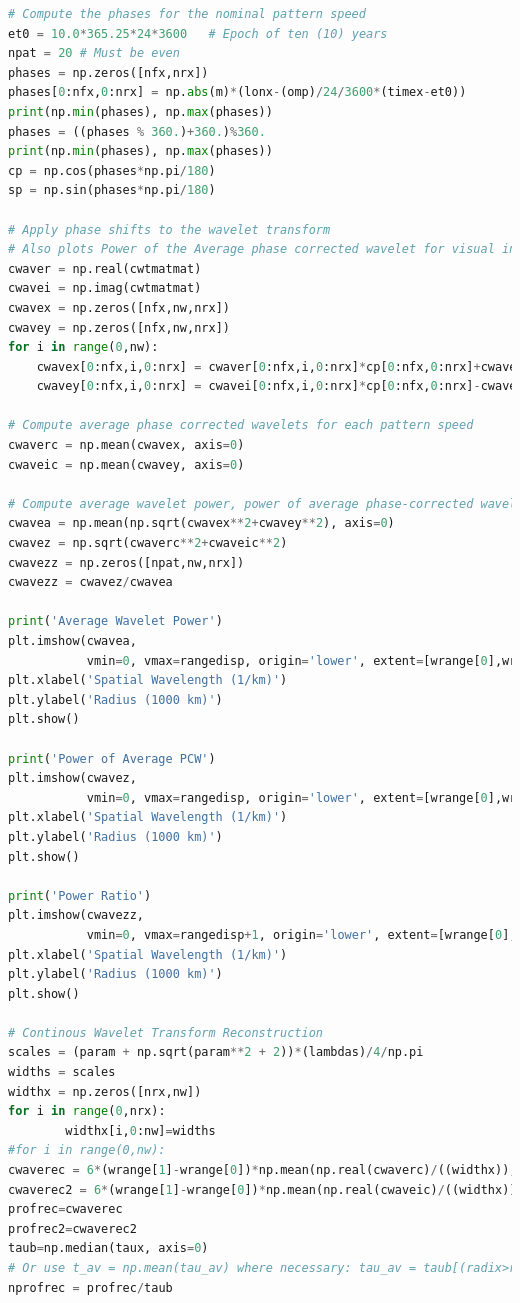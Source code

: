 \documentclass{article}
\begin{document}
\begin{lstlisting}[language=Python, caption=Python code snippet for Spiral Density Wave Analysis.]
# Compute the phases for the nominal pattern speed
et0 = 10.0*365.25*24*3600   # Epoch of ten (10) years
npat = 20 # Must be even
phases = np.zeros([nfx,nrx])
phases[0:nfx,0:nrx] = np.abs(m)*(lonx-(omp)/24/3600*(timex-et0))
print(np.min(phases), np.max(phases))
phases = ((phases % 360.)+360.)%360.
print(np.min(phases), np.max(phases))
cp = np.cos(phases*np.pi/180)
sp = np.sin(phases*np.pi/180)

# Apply phase shifts to the wavelet transform
# Also plots Power of the Average phase corrected wavelet for visual inspection
cwaver = np.real(cwtmatmat)
cwavei = np.imag(cwtmatmat)
cwavex = np.zeros([nfx,nw,nrx])
cwavey = np.zeros([nfx,nw,nrx])
for i in range(0,nw):
    cwavex[0:nfx,i,0:nrx] = cwaver[0:nfx,i,0:nrx]*cp[0:nfx,0:nrx]+cwavei[0:nfx,i,0:nrx]*sp[0:nfx,0:nrx]
    cwavey[0:nfx,i,0:nrx] = cwavei[0:nfx,i,0:nrx]*cp[0:nfx,0:nrx]-cwaver[0:nfx,i,0:nrx]*sp[0:nfx,0:nrx]

# Compute average phase corrected wavelets for each pattern speed 
cwaverc = np.mean(cwavex, axis=0)
cwaveic = np.mean(cwavey, axis=0)

# Compute average wavelet power, power of average phase-corrected wavelet for nominal case, and power ratio and make plots of all of them
cwavea = np.mean(np.sqrt(cwavex**2+cwavey**2), axis=0)
cwavez = np.sqrt(cwaverc**2+cwaveic**2)
cwavezz = np.zeros([npat,nw,nrx])
cwavezz = cwavez/cwavea

print('Average Wavelet Power')
plt.imshow(cwavea,
           vmin=0, vmax=rangedisp, origin='lower', extent=[wrange[0],wrange[1],xr[0],xr[1]], aspect='auto')
plt.xlabel('Spatial Wavelength (1/km)') 
plt.ylabel('Radius (1000 km)')
plt.show()

print('Power of Average PCW')
plt.imshow(cwavez,
           vmin=0, vmax=rangedisp, origin='lower', extent=[wrange[0],wrange[1],xr[0],xr[1]], aspect='auto')
plt.xlabel('Spatial Wavelength (1/km)')
plt.ylabel('Radius (1000 km)')
plt.show()

print('Power Ratio')
plt.imshow(cwavezz,
           vmin=0, vmax=rangedisp+1, origin='lower', extent=[wrange[0],wrange[1],xr[0],xr[1]], aspect='auto')
plt.xlabel('Spatial Wavelength (1/km)')
plt.ylabel('Radius (1000 km)')
plt.show()

# Continous Wavelet Transform Reconstruction
scales = (param + np.sqrt(param**2 + 2))*(lambdas)/4/np.pi
widths = scales
widthx = np.zeros([nrx,nw])
for i in range(0,nrx):
        widthx[i,0:nw]=widths
#for i in range(0,nw):
cwaverec = 6*(wrange[1]-wrange[0])*np.mean(np.real(cwaverc)/((widthx)), axis=1)
cwaverec2 = 6*(wrange[1]-wrange[0])*np.mean(np.real(cwaveic)/((widthx)), axis=1)
profrec=cwaverec
profrec2=cwaverec2
taub=np.median(taux, axis=0) 
# Or use t_av = np.mean(tau_av) where necessary: tau_av = taub[(radix>rwave[0]) & (radix<rwave[1])]
nprofrec = profrec/taub


\end{lstlisting}
\end{document}
